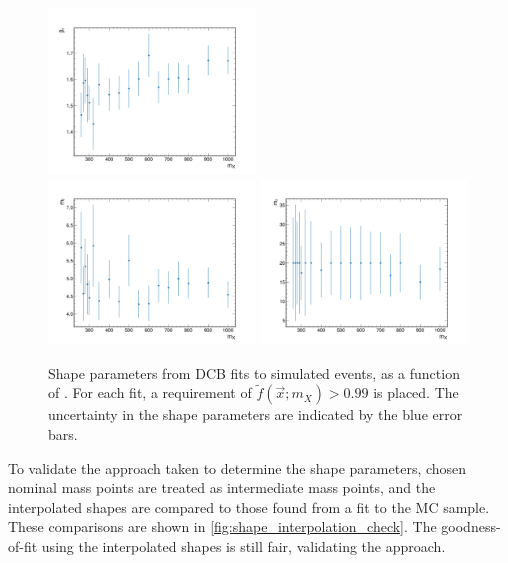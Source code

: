 \begin{figure}
  \includegraphics[width=0.49\textwidth]{Figures/Dihiggs/signal/shape_change/graviton_br.pdf} \\
  \includegraphics[width=0.49\textwidth]{Figures/Dihiggs/signal/shape_change/graviton_ml.pdf}
  \includegraphics[width=0.49\textwidth]{Figures/Dihiggs/signal/shape_change/graviton_mr.pdf} 
  \caption[DCB Shape Parameters as a Function of \mX in the \XTwoHH Search]{Shape parameters from DCB fits to simulated \XTwoHH events, as a function of \mX. For each fit, a requirement of $\tilde{f}(\vec{x};m_X)>0.99$ is placed. The uncertainty in the shape parameters are indicated by the blue error bars.}\label{fig:graviton_shape_change}
\end{figure}

To validate the approach taken to determine the shape parameters, chosen nominal mass points are treated as intermediate mass points, and the interpolated shapes are compared to those found from a fit to the MC sample. These comparisons are shown in \cref{fig:shape_interpolation_check}. The goodness-of-fit using the interpolated shapes is still fair, validating the approach.

